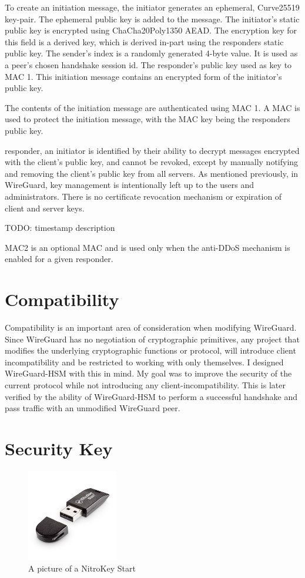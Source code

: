 \documentclass [11pt, proquest] {uwthesis}[2020/02/24]
\begin{document}
To create an initiation message, the initiator generates an ephemeral, Curve25519 key-pair. The ephemeral public key is added to the message. The initiator's static public key is encrypted using ChaCha20Poly1350 AEAD. The encryption key for this field is a derived key, which is derived in-part using the responders static public key.
The sender's index is a randomly generated 4-byte value. It is used as a peer's chosen handshake session id.
The responder's public key used as key to MAC 1. This initiation message contains an encrypted form of the initiator's public key.

The contents of the initiation message are authenticated using MAC 1.
A MAC is used to protect the initiation message, with the MAC key being the responders public key.

responder, an initiator is identified by their ability to decrypt messages encrypted with the client's public key, and cannot be revoked, except by manually notifying and removing the client’s public key from all servers. As mentioned previously, in WireGuard, key management is intentionally left up to the users and administrators. There is no certificate revocation mechanism or expiration of client and server keys.

TODO: timestamp description

MAC2 is an optional MAC and is used only when the anti-DDoS mechanism is enabled for a given responder. 

\section{Compatibility}
Compatibility is an important area of consideration when modifying WireGuard. Since WireGuard has no negotiation of cryptographic primitives, any project that modifies the underlying cryptographic functions or protocol, will introduce client incompatibility and be restricted to working with only themselves. I designed WireGuard-HSM with this in mind. My goal was to improve the security of the current protocol while not introducing any client-incompatibility. This is later verified by the ability of WireGuard-HSM to perform a successful handshake and pass traffic with an unmodified WireGuard peer.

\section{Security Key}
\begin{figure}[ht]
\includegraphics[width=4cm]{paper/images/nitrokey.jpg}
\caption{A picture of a NitroKey Start}
\label{nitrokey}
\end{figure}
\end{document}
